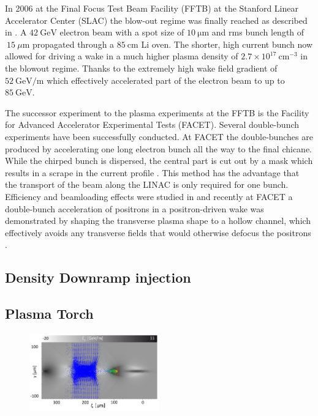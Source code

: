 In 2006 at the Final Focus Test Beam Facility (FFTB) at the Stanford Linear Accelerator Center (SLAC) the blow-out regime was finally reached as described in \cite{blumenfeld2007energyDoubling}.
A $42\ \mathrm{GeV}$ electron beam with a spot size of $10\ \mathrm{\mu m}$ and rms bunch length of $~15\ \mu\mathrm{m}$ propagated through a $85\ \mathrm{cm}$ Li oven. The shorter, high current bunch now allowed for driving a wake in a much higher plasma density of $2.7\times 10^{17}\ \mathrm{cm}^{-3} $ in the blowout regime. Thanks to the extremely high wake field gradient of $52\ \mathrm{GeV/m}$ which effectively accelerated part of the electron beam to up to $85\ \mathrm{GeV}$.

The successor experiment to the plasma experiments at the FFTB is the Facility for Advanced Accelerator Experimental Tests (FACET)\cite{clarke2012facet}. Several double-bunch experiments have been successfully conducted.  
At FACET the double-bunches are produced by accelerating one long electron bunch all the way to the final chicane. 
While the chirped bunch is dispersed, the central part is cut out by a mask which results in a scrape in the current profile  \cite{hogan2010FACET}. This method has the advantage that the transport of the beam along the LINAC is only required for one bunch.
Efficiency and beamloading effects were studied in \cite{litos2014high} and recently at FACET a double-bunch acceleration of positrons in a positron-driven wake was demonstrated by shaping the transverse plasma shape to a hollow channel, which effectively avoids any transverse fields that would otherwise defocus the positrons \cite{ThesisGessner}.
\subsection{Density Downramp injection}

\subsection{Plasma Torch}
\label{sec:PlaTo}
\cite{PlaTo,PlaTo2}

\begin{figure}[h]
\begin{center}
\includegraphics[width=0.5\textwidth]{simulations/images/edited/FF_torch.pdf}
\end{center}
\caption{}
\label{img:Plato_FF}
\end{figure}

